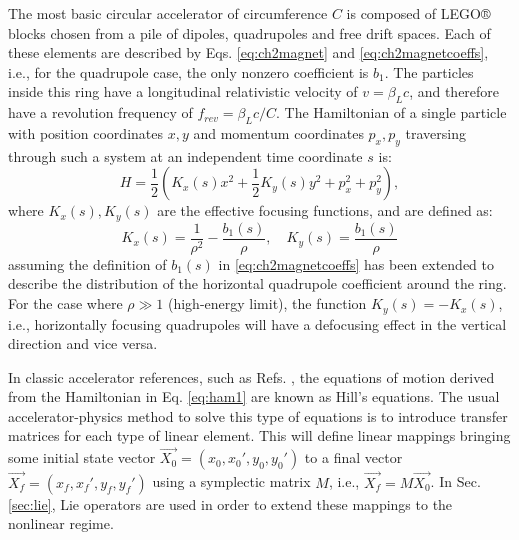 The most basic circular accelerator of circumference $C$ is composed of LEGO® blocks chosen from a pile of dipoles, quadrupoles and free drift spaces. Each of these elements are described by Eqs. \ref{eq:ch2magnet} and \ref{eq:ch2magnetcoeffs}, i.e., for the quadrupole case, the only nonzero coefficient is $b_1$. The particles inside this ring have a longitudinal relativistic velocity of $v=\beta_L c$, and therefore have a revolution frequency of $f_{rev}=\beta_L c/C$. The Hamiltonian of a single particle with position coordinates $x,y$ and momentum coordinates $p_x,p_y$ traversing through such a system at an independent time coordinate $s$ is:
\begin{equation}
    \label{eq:ham1}
    H=\frac{1}{2}\left( K_x(s)x^2+ \frac{1}{2}K_y(s)y^2+ p_x^2 + p_y^2\right),
\end{equation}
where $K_x(s),K_y(s)$ are the effective focusing functions, and are defined as:
\begin{equation}
    \label{eq:kx}
    K_x(s)=\frac{1}{\rho^2}-\frac{b_1(s)}{\rho}, \quad K_y(s)=\frac{b_1(s)}{\rho}
\end{equation}
assuming the definition of $b_1(s)$ in \ref{eq:ch2magnetcoeffs} has been extended to describe the distribution of the horizontal quadrupole coefficient around the ring. For the case where $\rho\gg 1$ (high-energy limit), the function $K_y(s)=-K_x(s)$, i.e., horizontally focusing quadrupoles will have a defocusing effect in the vertical direction and vice versa. 

In classic accelerator references, such as Refs. \cite{sylee,wolski,Wiedemann2015}, the equations of motion derived from the Hamiltonian in Eq. \ref{eq:ham1} are known as Hill's equations. The usual accelerator-physics method to solve this type of equations is to introduce transfer matrices for each type of linear element. This will define linear mappings bringing some initial state vector $\vec{X_0} = \left( x_0,x_0',y_0,y_0' \right)$ to a final vector $\vec{X_f} = \left( x_f,x_f',y_f,y_f' \right)$ using a symplectic matrix $M$, i.e., $\vec{X_f}=M\vec{X_0}$. In Sec. \ref{sec:lie}, Lie operators are used in order to extend these mappings to the nonlinear regime.    

